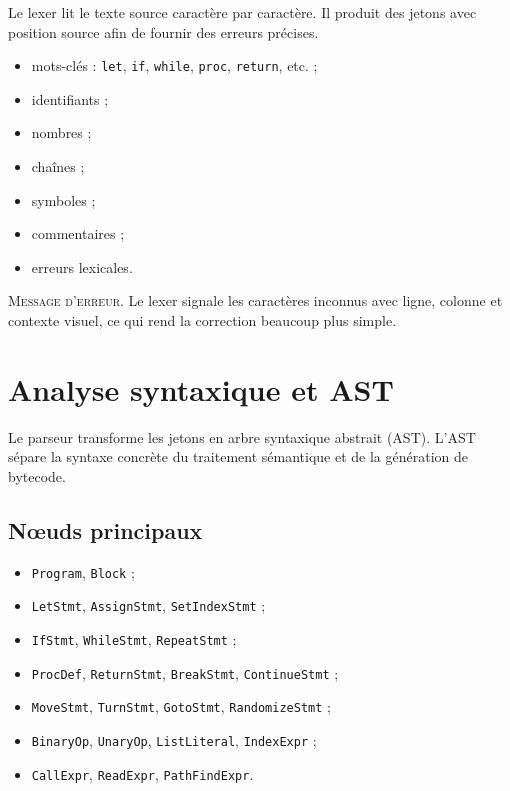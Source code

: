 \documentclass[12pt,a4paper]{article}
\newcommand{\smallcapslabel}[1]{\textcolor{accent}{\textsc{#1}}}
\begin{document}
Le lexer lit le texte source caractère par caractère. Il produit des jetons avec position
source afin de fournir des erreurs précises.

\begin{itemize}[nosep]
  \item mots-clés : \texttt{let}, \texttt{if}, \texttt{while}, \texttt{proc}, \texttt{return}, etc. ;
  \item identifiants ;
  \item nombres ;
  \item chaînes ;
  \item symboles ;
  \item commentaires ;
  \item erreurs lexicales.
\end{itemize}

\begin{darkbox}
\smallcapslabel{Message d'erreur.} Le lexer signale les caractères inconnus avec ligne,
colonne et contexte visuel, ce qui rend la correction beaucoup plus simple.
\end{darkbox}

\section{Analyse syntaxique et AST}

Le parseur transforme les jetons en arbre syntaxique abstrait (AST). L'AST sépare la
syntaxe concrète du traitement sémantique et de la génération de bytecode.

\subsection{Nœuds principaux}

\begin{itemize}[nosep]
  \item \texttt{Program}, \texttt{Block} ;
  \item \texttt{LetStmt}, \texttt{AssignStmt}, \texttt{SetIndexStmt} ;
  \item \texttt{IfStmt}, \texttt{WhileStmt}, \texttt{RepeatStmt} ;
  \item \texttt{ProcDef}, \texttt{ReturnStmt}, \texttt{BreakStmt}, \texttt{ContinueStmt} ;
  \item \texttt{MoveStmt}, \texttt{TurnStmt}, \texttt{GotoStmt}, \texttt{RandomizeStmt} ;
  \item \texttt{BinaryOp}, \texttt{UnaryOp}, \texttt{ListLiteral}, \texttt{IndexExpr} ;
  \item \texttt{CallExpr}, \texttt{ReadExpr}, \texttt{PathFindExpr}.
\end{itemize}
\end{document}
